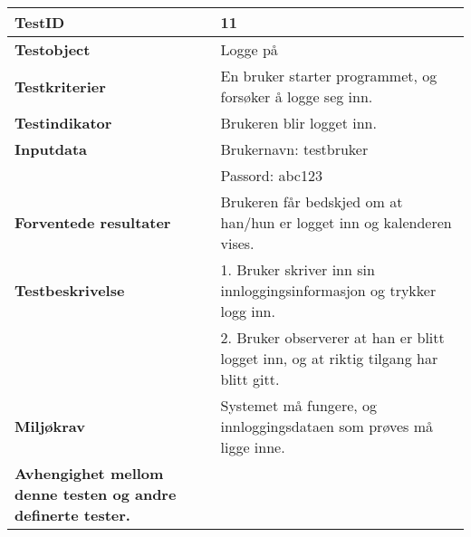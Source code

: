 	\begin{tabularx}{1.2\textwidth}{| p{5cm} | X |}
	\hline
	\textbf{TestID} 																& 11																	\\ \hline
	\textbf{Testobject} 															& Logge på															\\ \hline
	\textbf{Testkriterier} 															& En bruker starter programmet, og forsøker å logge seg inn.							\\ \hline
	\textbf{Testindikator} 															& Brukeren blir logget inn.													\\ \hline
	\textbf{Inputdata} 															& Brukernavn: testbruker													\\ 
																			& Passord: abc123														\\  \hline
	\textbf{Forventede resultater}									 				& Brukeren får bedskjed om at han/hun er logget inn og kalenderen vises.				\\ \hline
	\textbf{Testbeskrivelse} 														& 1. Bruker skriver inn sin innloggingsinformasjon og trykker logg inn.					\\
																			& 2. Bruker observerer at han er blitt logget inn, og at riktig tilgang har blitt gitt.					\\ \hline
	\textbf{Miljøkrav}			 												& Systemet må fungere, og innloggingsdataen som prøves må ligge inne.						\\ \hline
	\textbf{Avhengighet mellom denne testen og andre definerte tester.}		 				&				 													\\ \hline
	\end{tabularx}